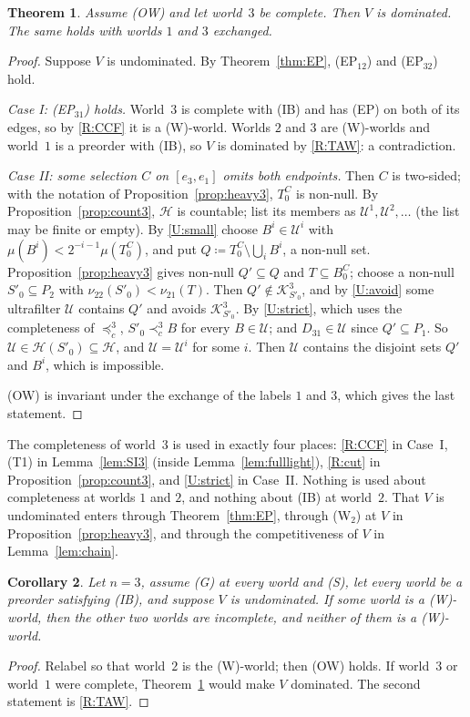 \documentclass[11pt]{article}
\newtheorem{theorem}{Theorem}
\newtheorem{corollary}[theorem]{Corollary}
\theoremstyle{definition}\newtheorem{definition}[theorem]{Definition}
\theoremstyle{remark}\newtheorem{remark}[theorem]{Remark}
\newcommand{\Kid}{\mathcal K}
\newcommand{\Uf}{\mathcal U}
\newcommand{\Hset}{\mathcal H}
\begin{document}
\begin{theorem}\label{thm:onecomplete}
Assume (OW) and let world~$3$ be complete. Then $V$ is dominated. The same
holds with worlds $1$ and $3$ exchanged.
\end{theorem}
\begin{proof}
Suppose $V$ is undominated. By Theorem~\ref{thm:EP}, (EP$_{12}$) and
(EP$_{32}$) hold.

\emph{Case I: (EP$_{31}$) holds.} World~$3$ is complete with (IB) and has
(EP) on both of its edges, so by \ref{R:CCF} it is a (W)-world. Worlds $2$
and $3$ are (W)-worlds and world~$1$ is a preorder with (IB), so $V$ is
dominated by \ref{R:TAW}: a contradiction.

\emph{Case II: some selection $C$ on $[e_3,e_1]$ omits both endpoints.}
Then $C$ is two-sided; with the notation of
Proposition~\ref{prop:heavy3}, $T^C_0$ is non-null. By
Proposition~\ref{prop:count3}, $\Hset$ is countable; list its members as
$\Uf^1,\Uf^2,\dots$ (the list may be finite or empty). By \ref{U:small}
choose $B^i\in\Uf^i$ with $\mu(B^i)<2^{-i-1}\mu(T^C_0)$, and put
$Q\coloneqq T^C_0\setminus\bigcup_iB^i$, a non-null set.
Proposition~\ref{prop:heavy3} gives non-null $Q'\subseteq Q$ and
$T\subseteq B^C_0$; choose a non-null $S'_0\subseteq P_2$ with
$\nu_{22}(S'_0)<\nu_{21}(T)$. Then $Q'\notin\Kid^3_{S'_0}$, and by
\ref{U:avoid} some ultrafilter $\Uf$ contains $Q'$ and avoids
$\Kid^3_{S'_0}$. By \ref{U:strict}, which uses the completeness of
$\preceq^3_c$, $S'_0\prec^3_cB$ for every $B\in\Uf$; and $D_{31}\in\Uf$
since $Q'\subseteq P_1$. So $\Uf\in\Hset(S'_0)\subseteq\Hset$, and
$\Uf=\Uf^i$ for some $i$. Then $\Uf$ contains the disjoint sets $Q'$ and
$B^i$, which is impossible.

(OW) is invariant under the exchange of the labels $1$ and $3$, which gives
the last statement.
\end{proof}

The completeness of world~$3$ is used in exactly four places: \ref{R:CCF} in
Case~I, (T1) in Lemma~\ref{lem:SI3} (inside Lemma~\ref{lem:fulllight}),
\ref{R:cut} in Proposition~\ref{prop:count3}, and \ref{U:strict} in
Case~II. Nothing is used about completeness at worlds $1$ and $2$, and
nothing about (IB) at world~$2$. That $V$ is undominated enters through
Theorem~\ref{thm:EP}, through (W$_2$) at $V$ in
Proposition~\ref{prop:heavy3}, and through the competitiveness of $V$ in
Lemma~\ref{lem:chain}.

\begin{corollary}\label{cor:Wforces}
Let $n=3$, assume (G) at every world and (S), let every world be a preorder
satisfying (IB), and suppose $V$ is undominated. If some world is a
(W)-world, then the other two worlds are incomplete, and neither of them is
a (W)-world.
\end{corollary}
\begin{proof}
Relabel so that world~$2$ is the (W)-world; then (OW) holds. If world~$3$ or
world~$1$ were complete, Theorem~\ref{thm:onecomplete} would make $V$
dominated. The second statement is \ref{R:TAW}.
\end{proof}
\end{document}
